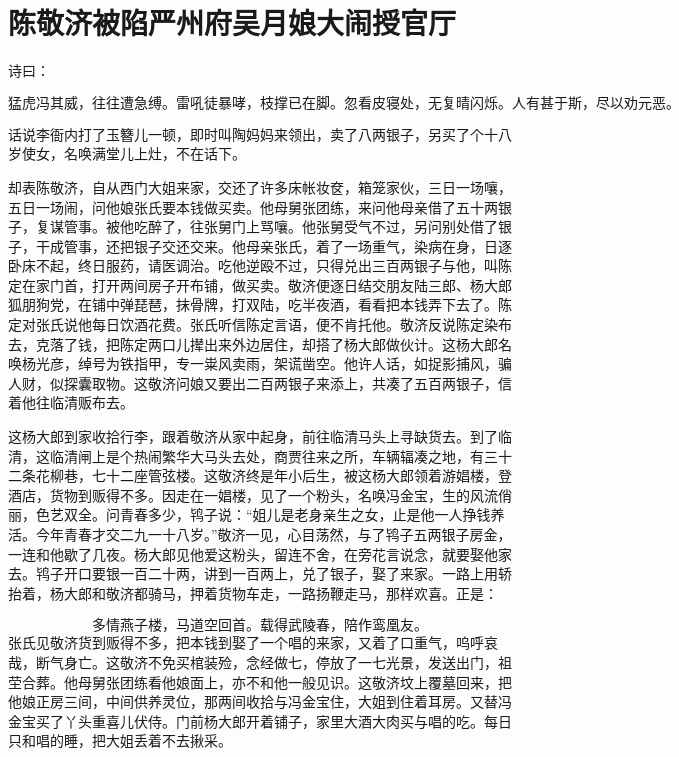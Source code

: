 

\chapter{陈敬济被陷严州府\KG 吴月娘大闹授官厅}


诗曰：

\[
猛虎冯其威，往往遭急缚。雷吼徒暴哮，枝撑已在脚。
忽看皮寝处，无复晴闪烁。人有甚于斯，尽以劝元恶。
\]

话说李衙内打了玉簪儿一顿，即时叫陶妈妈来领出，卖了八两银子，另买了个十八岁使女，名唤满堂儿上灶，不在话下。

却表陈敬济，自从西门大姐来家，交还了许多床帐妆奁，箱笼家伙，三日一场嚷，五日一场闹，问他娘张氏要本钱做买卖。他母舅张团练，来问他母亲借了五十两银子，复谋管事。被他吃醉了，往张舅门上骂嚷。他张舅受气不过，另问别处借了银子，干成管事，还把银子交还交来。他母亲张氏，着了一场重气，染病在身，日逐卧床不起，终日服药，请医调治。吃他逆殴不过，只得兑出三百两银子与他，叫陈定在家门首，打开两间房子开布铺，做买卖。敬济便逐日结交朋友陆三郎、杨大郎狐朋狗党，在铺中弹琵琶，抹骨牌，打双陆，吃半夜酒，看看把本钱弄下去了。陈定对张氏说他每日饮酒花费。张氏听信陈定言语，便不肯托他。敬济反说陈定染布去，克落了钱，把陈定两口儿撵出来外边居住，却搭了杨大郎做伙计。这杨大郎名唤杨光彦，绰号为铁指甲，专一粜风卖雨，架谎凿空。他许人话，如捉影捕风，骗人财，似探囊取物。这敬济问娘又要出二百两银子来添上，共凑了五百两银子，信着他往临清贩布去。

这杨大郎到家收拾行李，跟着敬济从家中起身，前往临清马头上寻缺货去。到了临清，这临清闸上是个热闹繁华大马头去处，商贾往来之所，车辆辐凑之地，有三十二条花柳巷，七十二座管弦楼。这敬济终是年小后生，被这杨大郎领着游娼楼，登酒店，货物到贩得不多。因走在一娼楼，见了一个粉头，名唤冯金宝，生的风流俏丽，色艺双全。问青春多少，鸨子说：“姐儿是老身亲生之女，止是他一人挣钱养活。今年青春才交二九一十八岁。”敬济一见，心目荡然，与了鸨子五两银子房金，一连和他歇了几夜。杨大郎见他爱这粉头，留连不舍，在旁花言说念，就要娶他家去。鸨子开口要银一百二十两，讲到一百两上，兑了银子，娶了来家。一路上用轿抬着，杨大郎和敬济都骑马，押着货物车走，一路扬鞭走马，那样欢喜。正是：

\[
多情燕子楼，马道空回首。
载得武陵春，陪作鸾凰友。
\]
张氏见敬济货到贩得不多，把本钱到娶了一个唱的来家，又着了口重气，呜呼哀哉，断气身亡。这敬济不免买棺装殓，念经做七，停放了一七光景，发送出门，祖茔合葬。他母舅张团练看他娘面上，亦不和他一般见识。这敬济坟上覆墓回来，把他娘正房三间，中间供养灵位，那两间收拾与冯金宝住，大姐到住着耳房。又替冯金宝买了丫头重喜儿伏侍。门前杨大郎开着铺子，家里大酒大肉买与唱的吃。每日只和唱的睡，把大姐丢着不去揪采。


